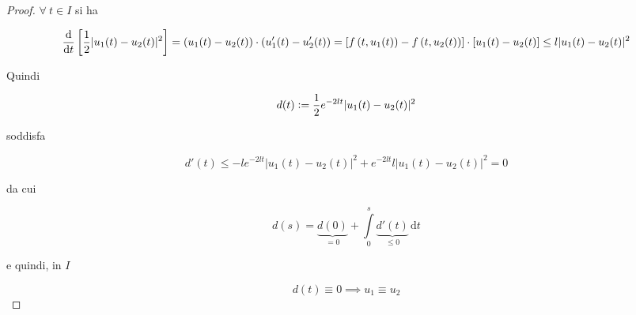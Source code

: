 \documentclass[hidelinks, 10pt]{report}
\begin{document}
\begin{proof}
$ \forall\ t \in I $ si ha

\begin{dmath*}
{ \frac{\mathrm{d}}{\mathrm{d}t} \left[ \frac{1}{2} \vert u_{1}(t) - u_{2}(t) \vert^{2} \right] } = { \left( u_{1}(t) - u_{2}(t) \right) \cdot \left( u_{1}' (t) - u_{2}' (t) \right) } = \\ { [ f \left( t, u_{1}(t) \right) - f \left( t, u_{2}(t) \right) ] \cdot [u_{1}(t) - u_{2}(t)] } \le { l \vert u_{1}(t) - u_{2} (t) \vert^{2} }
\end{dmath*}

Quindi

\[ d(t) \vcentcolon= \frac{1}{2} e^{-2lt} \vert u_{1}(t) - u_{2}(t) \vert^{2} \]

soddisfa

\[ d'(t) \le -l e^{-2lt} \vert u_{1}(t) - u_{2}(t) \vert^{2} + e^{-2lt} l \vert u_{1}(t) - u_{2}(t) \vert^{2} = 0 \]

da cui

\[ d(s) = \underbrace{d(0)}_{= 0} + \int\limits_{0}^{s} \underbrace{d'(t)}_{\le 0} \, \mathrm{d}t \]

e quindi, in $ I $

\[ d(t) \equiv 0 \implies u_{1} \equiv u_{2}  \]
\end{proof}
\end{document}
